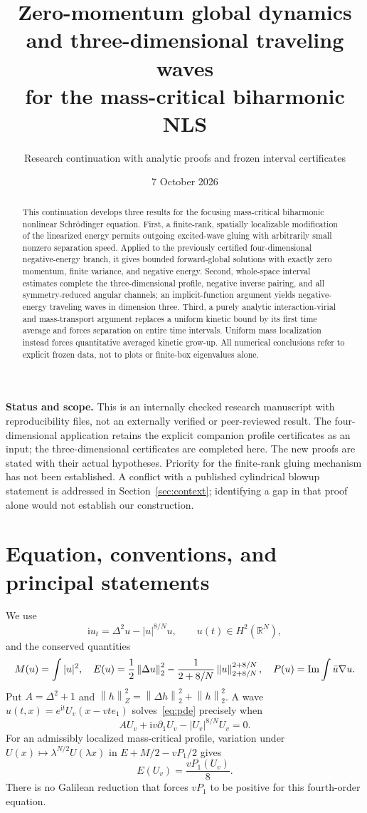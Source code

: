 \documentclass[11pt,a4paper]{article}
\title{Zero-momentum global dynamics and three-dimensional traveling waves\\for the mass-critical biharmonic NLS}
\author{Research continuation with analytic proofs and frozen interval certificates}
\date{7 October 2026}
\theoremstyle{remark}\newtheorem{remark}[theorem]{Remark}
\newcommand{\R}{\mathbb R}\newcommand{\C}{\mathbb C}
\newcommand{\ii}{\mathrm i}\newcommand{\dd}{\,\mathrm d}
\newcommand{\norm}[1]{\left\|#1\right\|}
\begin{document}
\maketitle
\begin{abstract}
This continuation develops three results for the focusing mass-critical biharmonic nonlinear Schr\"odinger equation. First, a finite-rank, spatially localizable modification of the linearized energy permits outgoing excited-wave gluing with arbitrarily small nonzero separation speed. Applied to the previously certified four-dimensional negative-energy branch, it gives bounded forward-global solutions with exactly zero momentum, finite variance, and negative energy. Second, whole-space interval estimates complete the three-dimensional profile, negative inverse pairing, and all symmetry-reduced angular channels; an implicit-function argument yields negative-energy traveling waves in dimension three. Third, a purely analytic interaction-virial and mass-transport argument replaces a uniform kinetic bound by its first time average and forces separation on entire time intervals. Uniform mass localization instead forces quantitative averaged kinetic grow-up. All numerical conclusions refer to explicit frozen data, not to plots or finite-box eigenvalues alone.
\end{abstract}

\noindent\textbf{Status and scope.} This is an internally checked research manuscript with reproducibility files, not an externally verified or peer-reviewed result. The four-dimensional application retains the explicit companion profile certificates as an input; the three-dimensional certificates are completed here. The new proofs are stated with their actual hypotheses. Priority for the finite-rank gluing mechanism has not been established. A conflict with a published cylindrical blowup statement is addressed in Section~\ref{sec:context}; identifying a gap in that proof alone would not establish our construction.

\section{Equation, conventions, and principal statements}
We use
\begin{equation}\label{eq:pde}
 \ii u_t=\Delta^2u-|u|^{8/N}u,\qquad u(t)\in H^2(\R^N),
\end{equation}
and the conserved quantities
\[
 M(u)=\int|u|^2,\quad
 E(u)=\frac12\norm{\Delta u}_2^2-
 \frac1{2+8/N}\norm u_{2+8/N}^{2+8/N},\quad
 P(u)=\Ima\int\bar u\nabla u.
\]
Put $A=\Delta^2+1$ and $\norm h_Z^2=\norm{\Delta h}_2^2+\norm h_2^2$.
A wave $u(t,x)=e^{\ii t}U_v(x-vte_1)$ solves~\eqref{eq:pde} precisely when
\begin{equation}\label{eq:profile}
 A U_v+\ii v\partial_1U_v-|U_v|^{8/N}U_v=0.
\end{equation}
For an admissibly localized mass-critical profile, variation under
$U(x)\mapsto\lambda^{N/2}U(\lambda x)$ in
$E+M/2-vP_1/2$ gives
\begin{equation}\label{eq:pohozaev}
 E(U_v)=\frac{vP_1(U_v)}8.
\end{equation}
There is no Galilean reduction that forces $vP_1$ to be positive for this fourth-order equation.
\end{document}
